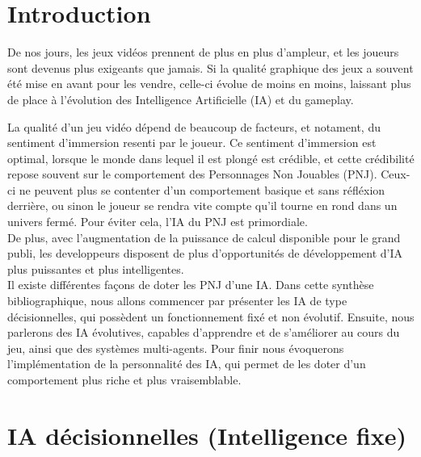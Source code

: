 \documentclass[asi]{picINSAIA}
\begin{document}
	
	\couverture{}
	
\newpage\null\thispagestyle{empty}\newpage
\tableofcontents{}

\chapter{Introduction}
De nos jours, les jeux vidéos prennent de plus en plus d'ampleur, et les joueurs sont devenus plus exigeants que jamais. 
Si la qualité graphique des jeux a souvent été mise en avant pour les vendre, celle-ci évolue de moins en moins, laissant plus de place à l'évolution des Intelligence Artificielle (IA) et du gameplay.

La qualité d'un jeu vidéo dépend de beaucoup de facteurs, et notament, du sentiment d'immersion resenti par le joueur. Ce sentiment d'immersion est optimal, lorsque le monde dans lequel il est plongé est crédible, et cette crédibilité repose souvent sur le comportement des Personnages Non Jouables (PNJ). Ceux-ci ne peuvent plus se contenter d'un comportement basique et sans réfléxion derrière, ou sinon le joueur se rendra vite compte qu'il tourne en rond dans un univers fermé. Pour éviter cela, l'IA du PNJ est primordiale. \\
De plus, avec l'augmentation de la puissance de calcul disponible pour le grand publi, les developpeurs disposent de plus d'opportunités de développement d'IA plus puissantes et plus intelligentes.\\

Il existe différentes façons de doter les PNJ d'une IA. Dans cette synthèse bibliographique, nous allons commencer par présenter les IA de type décisionnelles, qui possèdent un fonctionnement fixé et non évolutif. Ensuite, nous parlerons des IA évolutives, capables d'apprendre et de s'améliorer au cours du jeu, ainsi que des systèmes multi-agents. Pour finir nous évoquerons l'implémentation de la personnalité des IA, qui permet de les doter d'un comportement plus riche et plus vraisemblable.


\chapter{IA décisionnelles (Intelligence fixe)}
\end{document}
